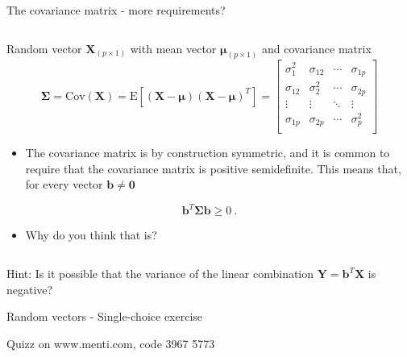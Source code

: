 \documentclass[ignorenonframetext,]{beamer}
\providecommand{\tightlist}{%
  \setlength{\itemsep}{0pt}\setlength{\parskip}{0pt}}
\begin{document}
\begin{frame}

\begin{block}{The covariance matrix - more requirements?}

\(~\)

Random vector \(\boldsymbol{X}_{(p\times 1)}\) with mean vector
\(\boldsymbol{\mu}_{(p\times 1)}\) and covariance matrix
\[\boldsymbol\Sigma=\text{Cov}(\boldsymbol{X})=\text{E}[(\boldsymbol{X}-\boldsymbol{\mu})(\boldsymbol{X}-\boldsymbol{\mu})^T]=
\left[ \begin{array}{cccc}
    \sigma_{1}^2 & \sigma_{12} & \cdots & \sigma_{1p}\\
    \sigma_{12} & \sigma_{2}^2 & \cdots & \sigma_{2p}\\
    \vdots & \vdots & \ddots & \vdots\\
    \sigma_{1p} & \sigma_{2p} & \cdots & \sigma_{p}^2\\
\end{array} \right]\]

\end{block}

\end{frame}

\begin{frame}

\begin{itemize}
\tightlist
\item
  The covariance matrix is by construction symmetric, and it is common
  to require that the covariance matrix is positive semidefinite. This
  means that, for every vector \(\boldsymbol{b}\neq \boldsymbol{0}\)
\end{itemize}

\[\boldsymbol{b}^T \boldsymbol{\Sigma} \boldsymbol{b} \geq 0 \ .\]

\begin{itemize}
\tightlist
\item
  Why do you think that is?
\end{itemize}

\(~\)

Hint: Is it possible that the variance of the linear combination
\(\boldsymbol{Y}=\boldsymbol{b}^T\boldsymbol{X}\) is negative?

\end{frame}

\begin{frame}

\begin{block}{Random vectors - Single-choice exercise}

\vspace{4mm}

Quizz on www.menti.com, code 3967 5773

\end{block}

\end{frame}
\end{document}
